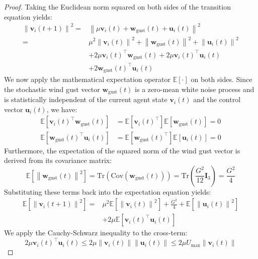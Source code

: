 \documentclass[letterpaper, 10pt, conference]{IEEEtran}
\newcommand{\norm}[1]{\left\lVert#1\right\rVert}
\begin{document}
\begin{proof}
Taking the Euclidean norm squared on both sides of the transition equation yields:
\begin{align}
    \norm{\mathbf{v}_i(t+1)}^2 = &\norm{\mu \mathbf{v}_i(t) + \mathbf{w}_{\text{gust}}(t) + \mathbf{u}_i(t)}^2 \nonumber \\
    = &\mu^2 \norm{\mathbf{v}_i(t)}^2 + \norm{\mathbf{w}_{\text{gust}}(t)}^2 + \norm{\mathbf{u}_i(t)}^2 \nonumber \\
    &+ 2\mu \mathbf{v}_i(t)^\top \mathbf{w}_{\text{gust}}(t) + 2\mu \mathbf{v}_i(t)^\top \mathbf{u}_i(t) \nonumber \\
    &+ 2 \mathbf{w}_{\text{gust}}(t)^\top \mathbf{u}_i(t)
\end{align}
We now apply the mathematical expectation operator $\mathbb{E}[\cdot]$ on both sides. Since the stochastic wind gust vector $\mathbf{w}_{\text{gust}}(t)$ is a zero-mean white noise process and is statistically independent of the current agent state $\mathbf{v}_i(t)$ and the control vector $\mathbf{u}_i(t)$, we have:
\begin{align}
    \mathbb{E}\left[\mathbf{v}_i(t)^\top \mathbf{w}_{\text{gust}}(t)\right] &= \mathbb{E}\left[\mathbf{v}_i(t)^\top\right] \mathbb{E}\left[\mathbf{w}_{\text{gust}}(t)\right] = 0 \\
    \mathbb{E}\left[\mathbf{w}_{\text{gust}}(t)^\top \mathbf{u}_i(t)\right] &= \mathbb{E}\left[\mathbf{w}_{\text{gust}}(t)^\top\right] \mathbb{E}\left[\mathbf{u}_i(t)\right] = 0
\end{align}
Furthermore, the expectation of the squared norm of the wind gust vector is derived from its covariance matrix:
\begin{equation}
    \mathbb{E}\left[\norm{\mathbf{w}_{\text{gust}}(t)}^2\right] = \text{Tr}\left(\text{Cov}(\mathbf{w}_{\text{gust}}(t))\right) = \text{Tr}\left(\frac{G^2}{12} \mathbf{I}_3\right) = \frac{G^2}{4}
\end{equation}
Substituting these terms back into the expectation equation yields:
\begin{align}
    \mathbb{E}\left[\norm{\mathbf{v}_i(t+1)}^2\right] = &\mu^2 \mathbb{E}\left[\norm{\mathbf{v}_i(t)}^2\right] + \frac{G^2}{4} + \mathbb{E}\left[\norm{\mathbf{u}_i(t)}^2\right] \nonumber \\
    &+ 2\mu \mathbb{E}\left[\mathbf{v}_i(t)^\top \mathbf{u}_i(t)\right]
\end{align}
We apply the Cauchy-Schwarz inequality to the cross-term:
\begin{equation}
    2\mu \mathbf{v}_i(t)^\top \mathbf{u}_i(t) \leq 2\mu \norm{\mathbf{v}_i(t)} \norm{\mathbf{u}_i(t)} \leq 2\mu U_{\max} \norm{\mathbf{v}_i(t)}

\end{equation}
\end{proof}
\end{document}

